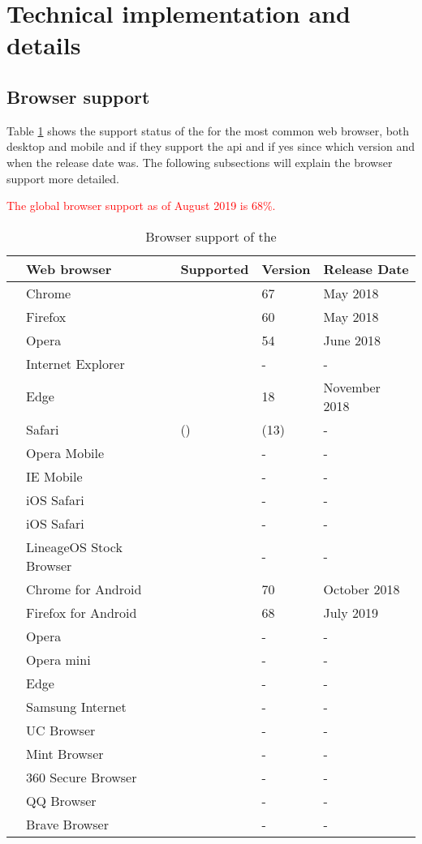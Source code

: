 \section{Technical implementation and details}

\newpage
\subsection{Browser support}

Table \ref{tab:browser-support} shows the support status of the \wa{} for the most common web browser, both desktop and mobile and if they support the \gls{api} and if yes since which version and when the release date was. The following subsections will explain the browser support more detailed.

\textcolor{red}{The global browser support as of August 2019 is 68\%.}
\begin{table}[ht]
\renewcommand\thetable{1}
\begin{tabularx}{\textwidth}{l|p{4.8cm}|p{2cm}|p{2cm}|p{3.3cm}}
	& Web browser & Supported & Version & Release Date \\
	\hline
	\parbox[t]{2mm}{} & Chrome & \OK & 67 & May 2018 \\
	& Firefox & \OK & 60 & May 2018 \\
	& Opera & \OK & 54 & June 2018 \\
	& Internet Explorer & \NOOK & - & - \\
	& Edge & \OK & 18 & November 2018 \\
	& Safari & (\OK) & (13) & - \\
	\hline
	\parbox[t]{2mm}{} & Opera Mobile & \NOOK & - & - \\
	& IE Mobile & \NOOK & - & - \\
	& iOS Safari & \NOOK & - & - \\
	& iOS Safari & \NOOK & - & - \\
	\hline
	\parbox[t]{2mm}{} & LineageOS Stock Browser & \NOOK & - & - \\
	& Chrome for Android & \OK & 70 & October 2018 \\
	& Firefox for Android & \OK & 68 & July 2019 \\
	& Opera & \NOOK & - & - \\
	& Opera mini & \NOOK & - & - \\
	& Edge & \NOOK & - & - \\
	& Samsung Internet & \NOOK & - & - \\
	& UC Browser & \NOOK & - & - \\	
	& Mint Browser & \NOOK & - & - \\
	& 360 Secure Browser & \NOOK & - & - \\
	& QQ Browser & \NOOK & - & - \\
	& Brave Browser & \NOOK & - & -
\end{tabularx}
\caption[Browser support of the \wa{}]{Browser support of the \wa{}\footnotemark} \label{tab:browser-support}
\end{table}
